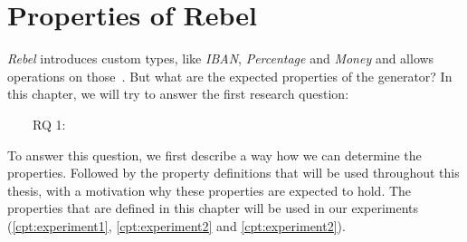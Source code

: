 \chapter{Properties of Rebel}
\label{cpt:properties}




\textit{Rebel} introduces custom types, like \textit{IBAN}, \textit{Percentage}
and \textit{Money} and allows operations on those~\cite{stoel2016solving}. But
what are the expected properties of the generator? In this chapter, we will try
to answer the first research question:
\begin{description}
	\item [~~~~RQ 1:] \rqOne
\end{description}
To answer this question, we first describe a way how we can determine the
properties. Followed by the property definitions that will be used throughout
this thesis, with a motivation why these properties are expected to hold. The
properties that are defined in this chapter will be used in our experiments
(\autoref{cpt:experiment1}, \autoref{cpt:experiment2} and
\autoref{cpt:experiment2}).


